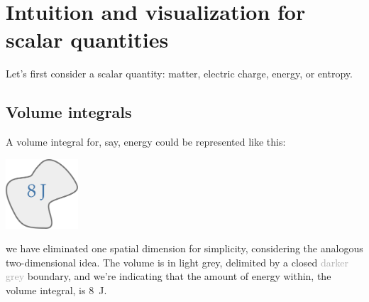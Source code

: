 \documentclass[a4paper,12pt,%
onecolumn,oneside,titlepage,%
british%
]{memoir}
\renewcommand*{\|}[1][]{\nonscript\:#1\vert\nonscript\:\mathopen{}}
\begin{document}
\section{Intuition and visualization for scalar quantities}
\label{sec:intuition_scalar}

Let's first consider a scalar quantity: matter, electric charge, energy, or entropy.

\subsection{Volume integrals}

A volume integral for, say, energy could be represented like this:
\begin{center}
  \includegraphics[align=t,height=7em]{volumeintegral_8J.pdf}
\end{center}
we have eliminated one spatial dimension for simplicity, considering the analogous two-dimensional idea. The volume is in \textcolor{midgrey}{light grey}, delimited by a closed \textcolor{darkgrey}{darker grey} boundary, and we're indicating that the amount of energy within, the volume integral, is \textcolor{bluepurple}{\qty{8}{J}}.
\end{document}
